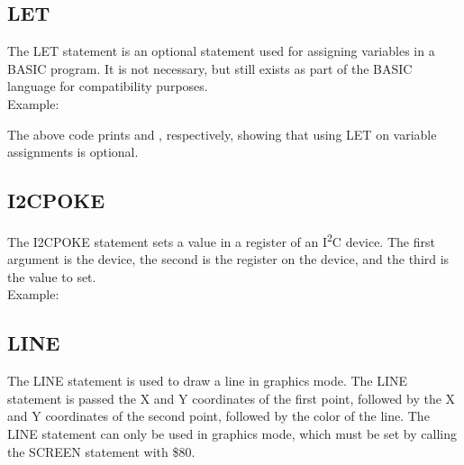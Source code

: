 \subsection{LET}

The {\ttfamily LET} statement is an optional statement used for assigning
variables in a BASIC program.  It is not necessary, but still exists as part of
the BASIC language for compatibility purposes.\\

Example:\\


The above code prints {} and {}, respectively, showing
that using {\ttfamily LET} on variable assignments is optional.

\subsection{I2CPOKE}

The {\ttfamily I2CPOKE} statement sets a value in a register of an
I\textsuperscript{2}C device.  The first argument is the device, the second is
the register on the device, and the third is the value to set.\\

Example:\\


\subsection{LINE}

The {\ttfamily LINE} statement is used to draw a line in graphics mode.  The
{\ttfamily LINE} statement is passed the X and Y coordinates of the first
point, followed by the X and Y coordinates of the second point, followed by the
color of the line.  The {\ttfamily LINE} statement can only be used in graphics
mode, which must be set by calling the {\ttfamily SCREEN} statement with
{\ttfamily \$80}.\\


